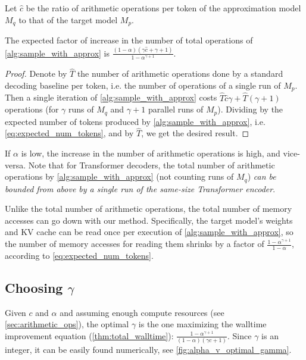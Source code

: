 \begin{definition}
Let $\hat{c}$ be the ratio of arithmetic operations per token of the approximation model $M_q$ to that of the target model $M_p$.
\end{definition}

\begin{theorem}
\label{thm:num_ops}
The expected factor of increase in the number of total operations of \ref{alg:sample_with_approx} is $\frac{(1-\alpha)({\gamma}\hat{c} + \gamma + 1)}{1 - \alpha^{\gamma + 1}}$.
\end{theorem}

\begin{proof}
Denote by $\hat{T}$ the number of arithmetic operations done by a standard decoding baseline per token, i.e. the number of operations of a single run of $M_p$. Then a single iteration of \ref{alg:sample_with_approx} costs $\hat{T}\hat{c}\gamma + \hat{T}(\gamma + 1)$ operations (for $\gamma$ runs of $M_q$ and $\gamma + 1$ parallel runs of $M_p$). Dividing by the expected number of tokens produced by \ref{alg:sample_with_approx}, i.e. \ref{eq:expected_num_tokens}, and by $\hat{T}$, we get the desired result.
\end{proof}

If $\alpha$ is low, the increase in the number of arithmetic operations is high, and vice-versa. Note that for Transformer decoders, the total number of arithmetic operations by \ref{alg:sample_with_approx} (not counting runs of $M_q$) \emph{can be bounded from above by a single run of the same-size Transformer encoder}.

Unlike the total number of arithmetic operations, the total number of memory accesses can go down with our method. Specifically, the target model's weights and KV cache can be read once per execution of \ref{alg:sample_with_approx}, so the number of memory accesses for reading them shrinks by a factor of $\frac{1 - \alpha^{\gamma + 1}}{1 - \alpha}$, according to \ref{eq:expected_num_tokens}.

\subsection{Choosing \texorpdfstring{$\gamma$}{gamma}}
\label{sec:optimal_gamma}
Given $c$ and $\alpha$ and assuming enough compute resources (see \ref{sec:arithmetic_ops}), the optimal $\gamma$ is the one maximizing the walltime improvement equation (\ref{thm:total_walltime}): $\frac{1 - \alpha^{\gamma + 1}}{(1-\alpha)({\gamma}c + 1)}$. Since $\gamma$ is an integer, it can be easily found numerically, see \ref{fig:alpha_v_optimal_gamma}.

